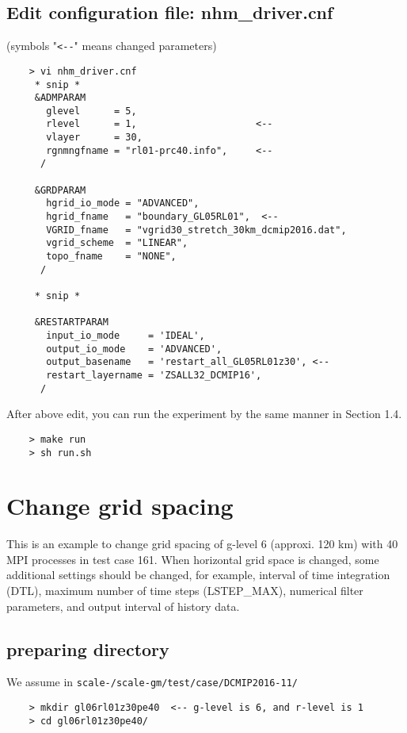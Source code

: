 \subsection{Edit configuration file: nhm\_driver.cnf}
 (symbols "\verb|<--|" means changed parameters)
 \begin{verbatim}
    > vi nhm_driver.cnf
     * snip *
     &ADMPARAM
       glevel      = 5,
       rlevel      = 1,                     <--
       vlayer      = 30,
       rgnmngfname = "rl01-prc40.info",     <--
      /

     &GRDPARAM
       hgrid_io_mode = "ADVANCED",
       hgrid_fname   = "boundary_GL05RL01",  <--
       VGRID_fname   = "vgrid30_stretch_30km_dcmip2016.dat",
       vgrid_scheme  = "LINEAR",
       topo_fname    = "NONE",
      /

     * snip *

     &RESTARTPARAM
       input_io_mode     = 'IDEAL',
       output_io_mode    = 'ADVANCED',
       output_basename   = 'restart_all_GL05RL01z30', <--
       restart_layername = 'ZSALL32_DCMIP16',
      /
 \end{verbatim}

 \noindent After above edit, you can run the experiment
 by the same manner in Section 1.4.
 \begin{verbatim}
    > make run
    > sh run.sh
 \end{verbatim}


\section{Change grid spacing}
 \noindent This is an example to change grid spacing of g-level 6
 (approxi. 120 km) with 40 MPI processes in test case 161.
 When horizontal grid space is changed, some additional settings
 should be changed, for example, interval of time integration (DTL),
 maximum number of time steps (LSTEP\_MAX), numerical filter parameters,
 and output interval of history data.

\subsection{preparing directory}
 We assume in \texttt{scale-{\version}/scale-gm/test/case/DCMIP2016-11/}
 \begin{verbatim}
    > mkdir gl06rl01z30pe40  <-- g-level is 6, and r-level is 1
    > cd gl06rl01z30pe40/
 \end{verbatim}

